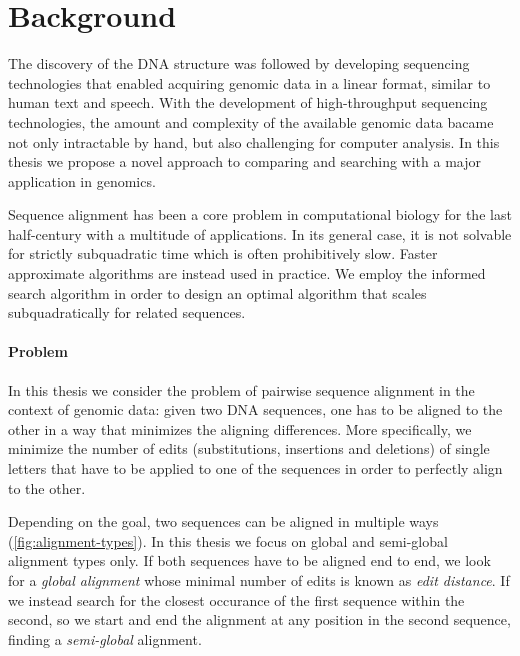 \section*{Background}

The discovery of the DNA structure\citep{watson1953structure} was followed by
developing sequencing technologies that enabled acquiring genomic data in a
linear format, similar to human text and speech. With the development of
high-throughput sequencing technologies, the amount and complexity of the
available genomic data bacame not only intractable by hand, but also challenging
for computer analysis. In this thesis we propose a novel approach to comparing
and searching with a major application in genomics. 

Sequence alignment has been a core problem in computational biology for the last
half-century with a multitude of applications. In its general case, it is not
solvable for strictly subquadratic time which is often prohibitively slow.
Faster approximate algorithms are instead used in practice. We employ  
the \A informed search algorithm in order to design an optimal algorithm that
scales subquadratically for related sequences.

\paragraph{Problem}
In this thesis we consider the problem of pairwise sequence alignment in the
context of genomic data: given two DNA sequences, one has to be aligned to the
other in a way that minimizes the aligning differences. More specifically, we
minimize the number of edits (substitutions, insertions and deletions) of single
letters that have to be applied to one of the sequences in order to perfectly
align to the other.

Depending on the goal, two sequences can be aligned in multiple ways
(\cref{fig:alignment-types}). In this thesis we focus on global and semi-global
alignment types only. If both sequences have to be aligned end to end, we look
for a \emph{global alignment} whose minimal number of edits is known as
\emph{edit distance}. If we instead search for the closest occurance of the
first sequence within the second, so we start and end the alignment at any
position in the second sequence, finding a \emph{semi-global} alignment.

